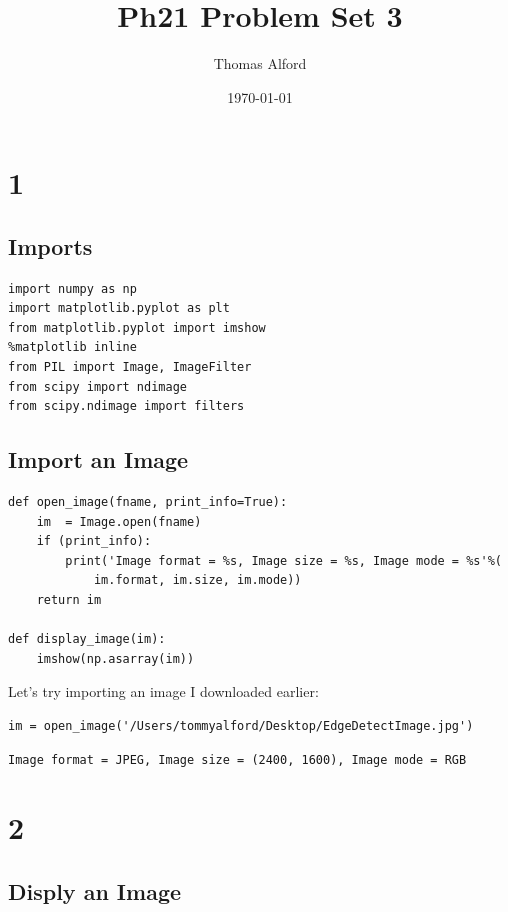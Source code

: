 \documentclass[11pt]{article}
\author{Thomas Alford}
\date{\today}
\title{Ph21 Problem Set 3}
\begin{document}
\maketitle
\section*{1}
\label{sec-1}
\subsection*{Imports}
\label{sec-1-1}
\begin{verbatim}
import numpy as np
import matplotlib.pyplot as plt
from matplotlib.pyplot import imshow
%matplotlib inline
from PIL import Image, ImageFilter
from scipy import ndimage
from scipy.ndimage import filters
\end{verbatim}

\subsection*{Import an Image}
\label{sec-1-2}

\begin{verbatim}
def open_image(fname, print_info=True):
    im  = Image.open(fname)
    if (print_info):
        print('Image format = %s, Image size = %s, Image mode = %s'%(
            im.format, im.size, im.mode))
    return im

def display_image(im):
    imshow(np.asarray(im))
\end{verbatim}


Let's try importing an image I downloaded earlier:

\begin{verbatim}
im = open_image('/Users/tommyalford/Desktop/EdgeDetectImage.jpg')
\end{verbatim}

\begin{verbatim}
Image format = JPEG, Image size = (2400, 1600), Image mode = RGB
\end{verbatim}

\section*{2}
\label{sec-2}
\subsection*{Disply an Image}
\label{sec-2-1}
\end{document}
